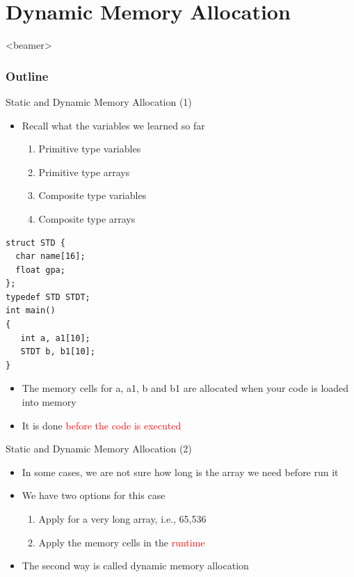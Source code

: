 \section{Dynamic Memory Allocation}
\label{sec:malloc}
\begin{frame}<beamer>
    \frametitle{Outline}
    \tableofcontents[currentsection]
\end{frame}

\begin{frame}[fragile]{Static and Dynamic Memory Allocation (1)}
\begin{itemize}
	\item {Recall what the variables we learned so far}
	\begin{enumerate}
		\item {Primitive type variables}
		\item {Primitive type arrays}
		\item {Composite type variables}
		\item {Composite type arrays}
	\end{enumerate}
\end{itemize}
\begin{lstlisting}[xleftmargin=0.32\linewidth, linewidth=0.6\linewidth]
struct STD {
  char name[16];
  float gpa;
};
typedef STD STDT;
int main()
{
   int a, a1[10];
   STDT b, b1[10];
}
\end{lstlisting}
\vspace{-0.1in}
\begin{itemize}
	\item {The memory cells for a, a1, b and b1 are allocated when your code is loaded into memory}
	\item {It is done \textcolor{red}{before the code is executed}}
\end{itemize}
\end{frame}

\begin{frame}[fragile]{Static and Dynamic Memory Allocation (2)}
\begin{itemize}
	\item {In some cases, we are not sure how long is the array we need before run it}\
	\item {We have two options for this case}
	\begin{enumerate}
		\item {Apply for a very long array, i.e., 65,536}
		\item {Apply the memory cells in the \textcolor{red}{runtime}}
	\end{enumerate}
	\item {The second way is called dynamic memory allocation}
\end{itemize}

\end{frame}

